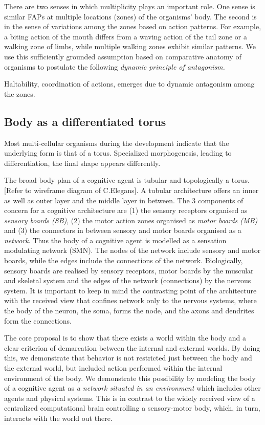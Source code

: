 There are two senses in which multiplicity plays an important role. One sense is similar FAPs at multiple locations (zones) of the organisms' body. The second is in the sense of variations among the zones based on action patterns.  For example, a biting action of the mouth differs from a waving action of the tail zone or a walking zone of limbs, while multiple walking zones exhibit similar patterns.  We use this sufficiently grounded assumption based on comparative anatomy of organisms to postulate the following \textit{dynamic principle of antagonism.}

Haltability, coordination of actions, emerges due to dynamic antagonism among the zones.  

\subsection{Body as a differentiated torus}
Most multi-cellular organisms during the development indicate that the underlying form is that of a torus. Specialized morphogenesis, leading to differentiation, the final shape appears differently. 

The broad body plan of a cognitive agent is tubular and topologically a torus. [Refer to wireframe diagram of C.Elegans]. A tubular architecture offers an inner as well as outer layer and the middle layer in between. The 3 components of concern for a cognitive architecture are (1) the sensory receptors organised as \textit{sensory boards (SB)}, (2) the motor action zones organised as \textit{motor boards (MB)} and (3) the connectors in between sensory and motor boards organised as a \textit{network}. Thus the body of a cognitive agent is modelled as a sensation modulating network (SMN). The nodes of the network include sensory and motor boards, while the edges include the connections of the network. Biologically, sensory boards are realised by sensory receptors, motor boards by the muscular and skeletal system and the edges of the network (connections) by the nervous system. It is important to keep in mind the contrasting point of the architecture with the received view that confines network only to the nervous systems, where the body of the neuron, the soma, forms the node, and the axons and dendrites form the connections.



The core proposal is to show that there exists a world within the body and a clear criterion of demarcation between the internal and external worlds. By doing this, we demonstrate that behavior is not restricted just between the body and the external world, but included action performed within the internal environment of the body. We demonstrate this possibility by modeling the body of a cognitive agent as \textit{a network situated in an environment} which includes other agents and physical systems. This is in contrast to the widely received view of a centralized computational brain controlling a sensory-motor body, which, in turn, interacts with the world out there.

